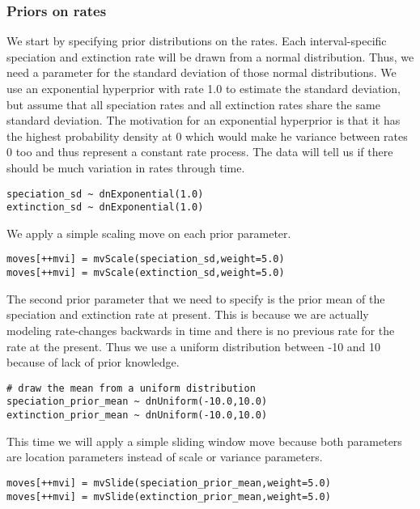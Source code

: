 \subsubsection{Priors on rates}
We start by specifying prior distributions on the rates.
Each interval-specific speciation and extinction rate will be drawn from a normal distribution.
Thus, we need a parameter for the standard deviation of those normal distributions.
We use an exponential hyperprior with rate 1.0 to estimate the standard deviation, but assume that all speciation rates and all extinction rates share the same standard deviation.
The motivation for an exponential hyperprior is that it has the highest probability density at 0 which would make he variance between rates 0 too and thus represent a constant rate process.
The data will tell us if there should be much variation in rates through time.
{\tt \begin{snugshade*}
\begin{lstlisting}
speciation_sd ~ dnExponential(1.0)
extinction_sd ~ dnExponential(1.0)
\end{lstlisting}
\end{snugshade*}}
We apply a simple scaling move on each prior parameter.
{\tt \begin{snugshade*}
\begin{lstlisting}
moves[++mvi] = mvScale(speciation_sd,weight=5.0)
moves[++mvi] = mvScale(extinction_sd,weight=5.0)
\end{lstlisting}
\end{snugshade*}}

The second prior parameter that we need to specify is the prior mean of the speciation and extinction rate at present.
This is because we are actually modeling rate-changes backwards in time and there is no previous rate for the rate at the present.
Thus we use a uniform distribution between -10 and 10 because of lack of prior knowledge.
{\tt \begin{snugshade*}
\begin{lstlisting}
# draw the mean from a uniform distribution
speciation_prior_mean ~ dnUniform(-10.0,10.0)
extinction_prior_mean ~ dnUniform(-10.0,10.0)
\end{lstlisting}
\end{snugshade*}}
This time we will apply a simple sliding window move because both parameters are location parameters instead of scale or variance parameters.
{\tt \begin{snugshade*}
\begin{lstlisting}
moves[++mvi] = mvSlide(speciation_prior_mean,weight=5.0)
moves[++mvi] = mvSlide(extinction_prior_mean,weight=5.0)
\end{lstlisting}
\end{snugshade*}}



